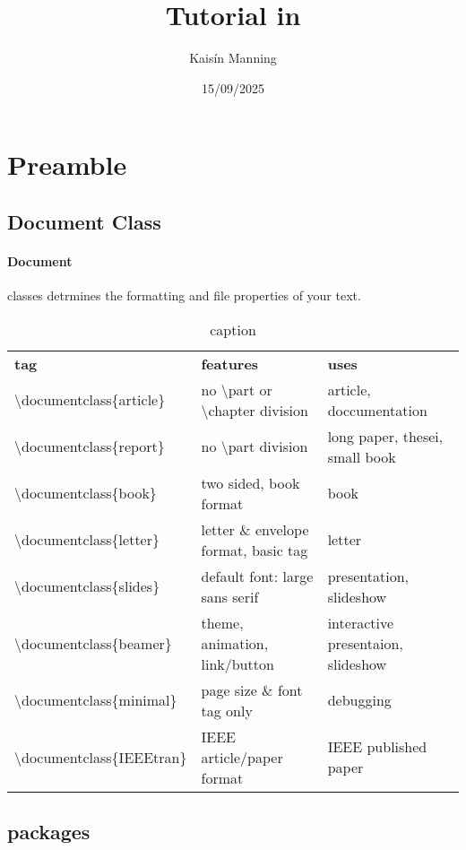 \documentclass{article}
\title{Tutorial in \latex}
\author{Kaisín Manning}
\date{15/09/2025}
\begin{document}
 
	\maketitle
	\newpage
 	
	\tableofcontents
	\newpage
	
	\section{Preamble}
	\subsection{Document Class}
		\paragraph{Document}classes detrmines the formatting and file properties of your text.\par
		\begin{table}[!th]
			\begin{tabular}{|l|l|l|}
			\hline
			\textbf{tag} & \textbf{features} & \textbf{uses}\\
			\textbackslash{documentclass\{article\}} & no \textbackslash{part} or \textbackslash{chapter} division & article, doccumentation\\
			\textbackslash{documentclass\{report\}} & no \textbackslash{part} division & long paper, thesei, small book\\
			\textbackslash{documentclass\{book\}} & two sided, book format & book\\
			\textbackslash{documentclass\{letter\}} & letter \& envelope format, basic tag & letter\\
			\textbackslash{documentclass\{slides\}} & default font: large sans serif & presentation, slideshow\\
			\textbackslash{documentclass\{beamer\}} & theme, animation, link/button & interactive presentaion, slideshow\\
			\textbackslash{documentclass\{minimal\}} & page size \& font tag only & debugging\\
			\textbackslash{documentclass\{IEEEtran\}} & IEEE article/paper format & IEEE published paper\\
			\hline
			\end{tabular}
			\caption{caption}
		\end{table}
	\subsection{packages}
\end{document}
